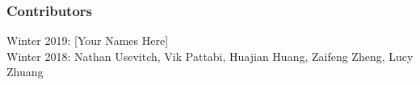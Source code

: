 \documentclass[]{article}
\begin{document}



\subsubsection*{Contributors}
Winter 2019: [Your Names Here]
\\
Winter 2018: Nathan Usevitch, Vik Pattabi, Huajian Huang, Zaifeng Zheng, Lucy Zhuang
\end{document}
